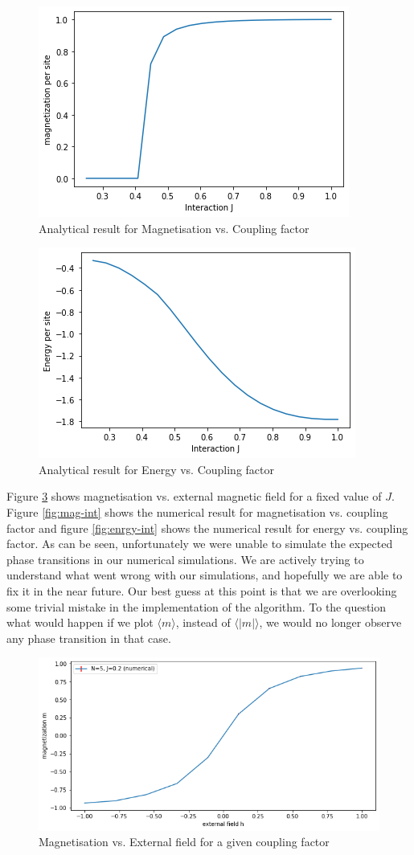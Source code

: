 \documentclass{article}
\begin{document}
\begin{figure}[h!]
    \centering
    \includegraphics[width=.6\textwidth]{mag-int-analy.png}
    \caption{Analytical result for Magnetisation vs. Coupling factor}
    \label{fig:mag-int-analy}
\end{figure}
\begin{figure}[h!]
    \centering
    \includegraphics[width=.6\textwidth]{energy-int-analy.png}
    \caption{Analytical result for Energy vs. Coupling factor}
    \label{fig:energy-int-analy}
\end{figure}
Figure \ref{fig:mag-h} shows magnetisation vs. external magnetic field for a fixed value of $J$. Figure \ref{fig:mag-int} shows the numerical result for magnetisation vs. coupling factor and figure \ref{fig:enrgy-int} shows the numerical result for energy vs. coupling factor. As can be seen, unfortunately we were unable to simulate the expected phase transitions in our numerical simulations. We are actively trying to understand what went wrong with our simulations, and hopefully we are able to fix it in the near future. Our best guess at this point is that we are overlooking some trivial mistake in the implementation of the algorithm. To the question what would happen if we plot $\langle m \rangle$, instead of $\langle \vert m \vert \rangle$, we would no longer observe any phase transition in that case.
\begin{figure}[h!]
    \centering
    \includegraphics[width=.6\textwidth]{mag-h.png}
    \caption{Magnetisation vs. External field for a given coupling factor}
    \label{fig:mag-h}
\end{figure}
\end{document}
